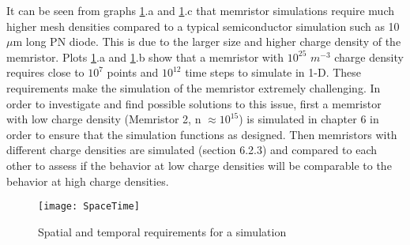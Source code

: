 \begin{doublespace}
It can be seen from graphs \ref{SpaceTime}.a and \ref{SpaceTime}.c that memristor simulations require much higher mesh densities compared to a typical semiconductor simulation such as 10 $\mu$m long PN diode. This is due to the larger size and higher charge density of the memristor. Plots \ref{SpaceTime}.a and \ref{SpaceTime}.b show that a memristor with $10^{25}$ $m^{-3}$ charge density requires close to $10^7$ points and $10^{12}$ time steps to simulate in 1-D. These requirements make the simulation of the memristor extremely challenging. In order to investigate and find possible solutions to this issue, first a memristor with low charge density (Memristor 2, n $\approx 10^{15}$) is simulated in chapter 6 in order to ensure that the simulation functions as designed. Then memristors with different charge densities are simulated (section 6.2.3) and compared to each other to assess if the behavior at low charge densities will be comparable to the behavior at high charge densities.


\begin{landscape}
\begin{figure}[htp]
\centering
\texttt{[image: SpaceTime]}
\caption{Spatial and temporal requirements for a simulation} 
\label{SpaceTime}
\end{figure}
\end{landscape}

\end{doublespace}
